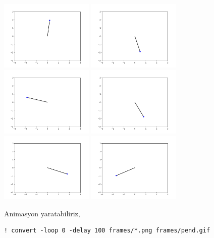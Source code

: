 \documentclass[12pt,fleqn]{article}\usepackage{../../common}
\begin{document}
\includegraphics[width=12em]{frames/img0000.png}
\includegraphics[width=12em]{frames/img0020.png}
\includegraphics[width=12em]{frames/img0030.png}
\includegraphics[width=12em]{frames/img0040.png}
\includegraphics[width=12em]{frames/img0050.png}
\includegraphics[width=12em]{frames/img0060.png}

Animasyon yaratabiliriz,

\begin{verbatim}
! convert -loop 0 -delay 100 frames/*.png frames/pend.gif
\end{verbatim}
\end{document}
